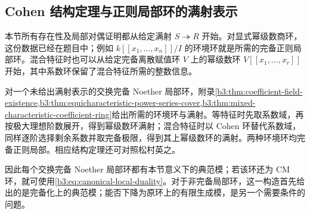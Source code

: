 \subsection{Cohen 结构定理与正则局部环的满射表示}
\label{b3:subsec:2202:07}

本节所有存在性及局部对偶证明都从给定满射 \(S\twoheadrightarrow R\) 开始。对显式幂级数商环，这份数据已经在题目中；例如 \(k[\![x_1,\ldots,x_n]\!]/I\) 的环境环就是所需的完备正则局部环。混合特征时也可以从给定完备离散赋值环 \(V\) 上的幂级数环 \(V[\![x_1,\ldots,x_r]\!]\) 开始，其中系数环保留了混合特征所需的整数信息。

\ProseParagraphBreak
对一个未给出满射表示的交换完备 Noether 局部环，附录\cref{b3:thm:coefficient-field-existence,b3:thm:equicharacteristic-power-series-cover,b3:thm:mixed-characteristic-coefficient-ring}给出所需的环境环与满射。等特征时先取系数域，再按极大理想阶数展开，得到幂级数环满射；混合特征时以 Cohen 环替代系数域，同样逐阶选择剩余系数并取完备极限，得到其上幂级数环的满射。两种环境环均完备正则局部。相应结构定理还可对照松村英之\cite[\S 29, Theorems 29.3--29.4, pp. 225--226]{Matsumura1989CommutativeRingTheory}。

\ProseParagraphBreak
因此每个交换完备 Noether 局部环都有本节意义下的典范模；若该环还为 CM 环，就可使用\eqref{b3:eq:canonical-local-duality}。对于非完备局部环，这一构造首先给出的是完备化上的典范模；能否下降为原环上的有限生成模，是另一个需要条件的问题。
